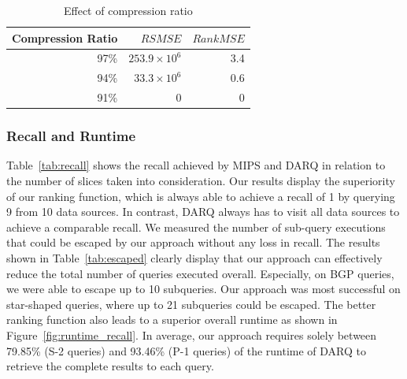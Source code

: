 \documentclass{sig-alternate}  %
\begin{document}
\begin{table}
\centering
\begin{tabular}{rrr}
\hline
Compression Ratio		& $RSMSE$	& $RankMSE$ \\\hline
97\%	& $253.9 \times 10^6$	& 3.4 \\
94\%	& $33.3 \times 10^6$	& 0.6 \\
91\%	& 0					&	0 \\\hline
\end{tabular}
\caption{Effect of compression ratio}
\label{tab:compression}
\end{table}

\subsubsection{Recall and Runtime}

Table~\ref{tab:recall} shows the recall achieved by MIPS and DARQ in relation to the number of slices taken into consideration. 
Our results display the superiority of our ranking function, which is always able to achieve a recall of 1 by querying 9 from 10 data sources. 
In contrast, DARQ always has to visit all data sources to achieve a comparable recall. 
We measured the number of sub-query executions that could be escaped by our approach without any loss in recall. 
The results shown in Table~\ref{tab:escaped} clearly display that our approach can effectively reduce the total number of queries executed overall.
Especially, on BGP queries, we were able to escape up to 10 subqueries. 
Our approach was most successful on star-shaped queries, where up to 21 subqueries could be escaped. 
The better ranking function also leads to a superior overall runtime as shown in Figure~\ref{fig:runtime_recall}.
In average, our approach requires solely between 79.85\% (S-2 queries) and 93.46\% (P-1 queries) of the runtime of DARQ to retrieve the complete results to each query.
\end{document}
